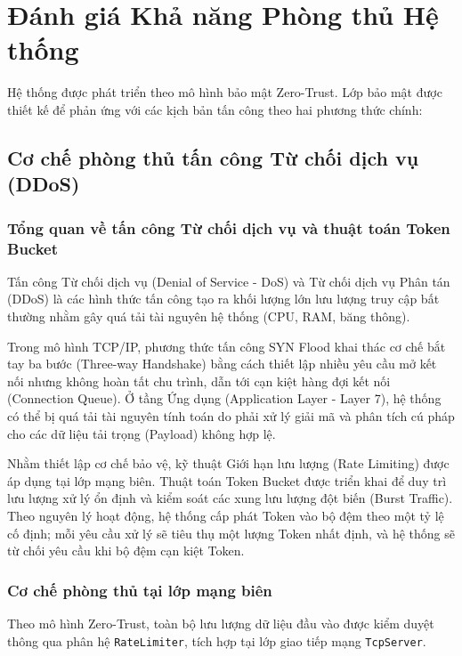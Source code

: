 \section{Đánh giá Khả năng Phòng thủ Hệ thống}

Hệ thống được phát triển theo mô hình bảo mật Zero-Trust. Lớp bảo mật được thiết kế để phản ứng với các kịch bản tấn công theo hai phương thức chính:

\subsection[Phòng thủ trước tấn công Từ chối dịch vụ]{Cơ chế phòng thủ tấn công Từ chối dịch vụ (DDoS)}

\subsubsection[Cơ sở lý thuyết về tấn công Từ chối dịch vụ]{Tổng quan về tấn công Từ chối dịch vụ và thuật toán Token Bucket}

Tấn công Từ chối dịch vụ (Denial of Service - DoS) và Từ chối dịch vụ Phân tán (DDoS) là các hình thức tấn công tạo ra khối lượng lớn lưu lượng truy cập bất thường nhằm gây quá tải tài nguyên hệ thống (CPU, RAM, băng thông).

Trong mô hình TCP/IP, phương thức tấn công SYN Flood khai thác cơ chế bắt tay ba bước (Three-way Handshake) bằng cách thiết lập nhiều yêu cầu mở kết nối nhưng không hoàn tất chu trình, dẫn tới cạn kiệt hàng đợi kết nối (Connection Queue). Ở tầng Ứng dụng (Application Layer - Layer 7), hệ thống có thể bị quá tải tài nguyên tính toán do phải xử lý giải mã và phân tích cú pháp cho các dữ liệu tải trọng (Payload) không hợp lệ.

Nhằm thiết lập cơ chế bảo vệ, kỹ thuật Giới hạn lưu lượng (Rate Limiting) được áp dụng tại lớp mạng biên. Thuật toán Token Bucket được triển khai để duy trì lưu lượng xử lý ổn định và kiểm soát các xung lưu lượng đột biến (Burst Traffic). Theo nguyên lý hoạt động, hệ thống cấp phát Token vào bộ đệm theo một tỷ lệ cố định; mỗi yêu cầu xử lý sẽ tiêu thụ một lượng Token nhất định, và hệ thống sẽ từ chối yêu cầu khi bộ đệm cạn kiệt Token.

\subsubsection{Cơ chế phòng thủ tại lớp mạng biên}

Theo mô hình Zero-Trust, toàn bộ lưu lượng dữ liệu đầu vào được kiểm duyệt thông qua phân hệ \texttt{RateLimiter}, tích hợp tại lớp giao tiếp mạng \texttt{TcpServer}.

